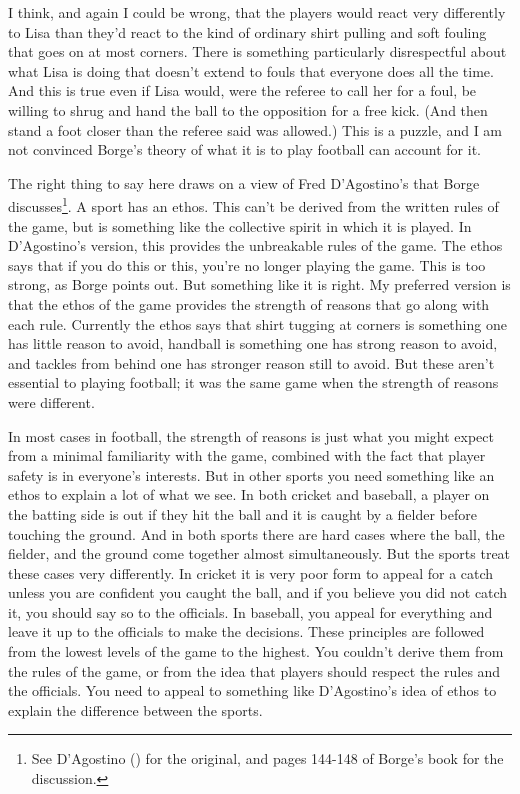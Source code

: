 \documentclass[
  10pt,
  letterpaper,
  DIV=11,
  numbers=noendperiod,
  twoside]{scrartcl}
\begin{document}
I think, and again I could be wrong, that the players would react very
differently to Lisa than they'd react to the kind of ordinary shirt
pulling and soft fouling that goes on at most corners. There is
something particularly disrespectful about what Lisa is doing that
doesn't extend to fouls that everyone does all the time. And this is
true even if Lisa would, were the referee to call her for a foul, be
willing to shrug and hand the ball to the opposition for a free kick.
(And then stand a foot closer than the referee said was allowed.) This
is a puzzle, and I am not convinced Borge's theory of what it is to play
football can account for it.

The right thing to say here draws on a view of Fred D'Agostino's that
Borge discusses\footnote{See D'Agostino
  () for the original, and pages
  144-148 of Borge's book for the discussion.}. A sport has an ethos.
This can't be derived from the written rules of the game, but is
something like the collective spirit in which it is played. In
D'Agostino's version, this provides the unbreakable rules of the game.
The ethos says that if you do this or this, you're no longer playing the
game. This is too strong, as Borge points out. But something like it is
right. My preferred version is that the ethos of the game provides the
strength of reasons that go along with each rule. Currently the ethos
says that shirt tugging at corners is something one has little reason to
avoid, handball is something one has strong reason to avoid, and tackles
from behind one has stronger reason still to avoid. But these aren't
essential to playing football; it was the same game when the strength of
reasons were different.

In most cases in football, the strength of reasons is just what you
might expect from a minimal familiarity with the game, combined with the
fact that player safety is in everyone's interests. But in other sports
you need something like an ethos to explain a lot of what we see. In
both cricket and baseball, a player on the batting side is out if they
hit the ball and it is caught by a fielder before touching the ground.
And in both sports there are hard cases where the ball, the fielder, and
the ground come together almost simultaneously. But the sports treat
these cases very differently. In cricket it is very poor form to appeal
for a catch unless you are confident you caught the ball, and if you
believe you did not catch it, you should say so to the officials. In
baseball, you appeal for everything and leave it up to the officials to
make the decisions. These principles are followed from the lowest levels
of the game to the highest. You couldn't derive them from the rules of
the game, or from the idea that players should respect the rules and the
officials. You need to appeal to something like D'Agostino's idea of
ethos to explain the difference between the sports.
\end{document}
